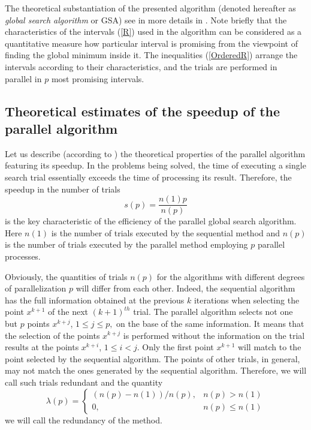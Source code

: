 \documentclass[runningheads]{llncs}
\begin{document}
The theoretical substantiation of the presented algorithm (denoted hereafter as \textit{global search algorithm} or GSA) see in more details in \cite{Strongin2000}. Note briefly that the characteristics of the intervals (\ref{R}) used in the algorithm can be considered as a quantitative measure how particular interval is promising from the viewpoint of finding the global minimum inside it. The inequalities (\ref{OrderedR}) arrange the intervals according to their characteristics, and the trials are performed in parallel in $p$ most promising intervals.

\subsection{Theoretical estimates of the speedup of the parallel algorithm}

Let us describe (according to \cite{Strongin2000}) the theoretical properties of the parallel algorithm featuring its speedup. In the problems being solved, the time of executing a single search trial essentially exceeds the time of processing its result. Therefore, the speedup in the number of trials 
\begin{equation} \label{par_trl_ref}
s(p) = \frac{n(1)p}{n(p)}
\end{equation}
is the key characteristic of the efficiency of the parallel global search algorithm.
Here $n(1)$ is the number of trials executed by the sequential method and $n(p)$ is the number of trials executed by the parallel method employing $p$ parallel processes.

Obviously, the quantities of trials $n(p)$ for the algorithms with different degrees of parallelization $p$ will differ from each other. Indeed, the sequential algorithm has the full information obtained at the previous $k$ iterations when selecting the point $x^{k+1}$ of the next $(k+1)^{th}$ trial. The parallel algorithm selects not one but $p$ points $x^{k+j}$, $1 \leq j \leq p,$ on the base of the same information. It means that the selection of the points $x^{k+j}$ is performed without the information on the trial results at the points $x^{k+i}$, $1 \leq i < j$. Only the first point $x^{k+1}$ will match to the point selected by the sequential algorithm. The points of other trials, in general, may not match the ones generated by the sequential algorithm. Therefore, we will call such trials redundant and the quantity
\begin{displaymath}
\lambda(p) = \left\{ \begin{array}{ll}
                (n(p) - n(1)) / n(p), & \textrm{$n(p) > n(1)$}\\
                0, & \textrm{$n(p) \leq n(1)$}
  \end{array} \right.
\end{displaymath}
we will call the redundancy of the method.
\end{document}
